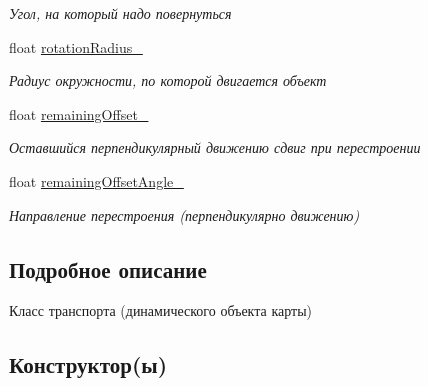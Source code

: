 \begin{DoxyCompactItemize}
\begin{DoxyCompactList}\small\item\em Угол, на который надо повернуться \end{DoxyCompactList}\item 
\mbox{\label{classrtm_1_1_vehicle_object_a1d89228e0e78c3edcc71c1196222c11f}} 
float \hyperlink{classrtm_1_1_vehicle_object_a1d89228e0e78c3edcc71c1196222c11f}{rotation\+Radius\+\_\+}
\begin{DoxyCompactList}\small\item\em Радиус окружности, по которой двигается объект \end{DoxyCompactList}\item 
\mbox{\label{classrtm_1_1_vehicle_object_a79954d52d836f41f45a8c960708b6ad7}} 
float \hyperlink{classrtm_1_1_vehicle_object_a79954d52d836f41f45a8c960708b6ad7}{remaining\+Offset\+\_\+}
\begin{DoxyCompactList}\small\item\em Оставшийся перпендикулярный движению сдвиг при перестроении \end{DoxyCompactList}\item 
\mbox{\label{classrtm_1_1_vehicle_object_a94a0837b95aee16ec5662a1188f70c81}} 
float \hyperlink{classrtm_1_1_vehicle_object_a94a0837b95aee16ec5662a1188f70c81}{remaining\+Offset\+Angle\+\_\+}
\begin{DoxyCompactList}\small\item\em Направление перестроения (перпендикулярно движению) \end{DoxyCompactList}\end{DoxyCompactItemize}


\subsection{Подробное описание}
Класс транспорта (динамического объекта карты) 

\subsection{Конструктор(ы)}
\mbox{\label{classrtm_1_1_vehicle_object_aa14dd490d0828a12ab1e8f32bab4c98b}} 
